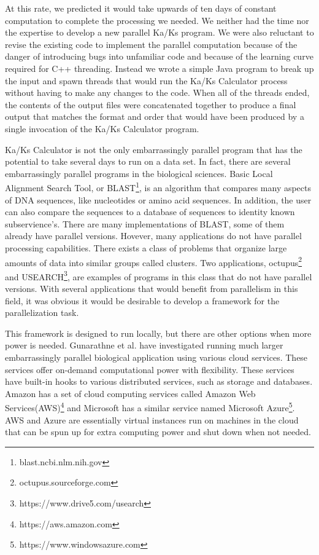 \documentclass[12pt]{article}
\begin{document}
At this rate, we predicted it would take upwards of ten days of constant
computation to complete the processing we needed. We neither had the time nor
the expertise to develop a new parallel Ka/Ks program. We were also reluctant to
revise the existing code to implement the parallel computation because of the
danger of introducing bugs into unfamiliar code and because of the learning
curve required for C++ threading. Instead we wrote a simple Java program to
break up the input and spawn threads that would run the Ka/Ks Calculator process
without having to make any changes to the code. When all of the threads ended,
the contents of the output files were concatenated together to produce a final
output that matches the format and order that would have been produced by a
single invocation of the Ka/Ks Calculator program.

Ka/Ks Calculator is not the only embarrassingly parallel program that has the
potential to take several days to run on a data set. In fact, there are several
embarrassingly parallel programs in the biological sciences. Basic Local
Alignment Search Tool, or BLAST\footnote{blast.ncbi.nlm.nih.gov}, is an
algorithm that compares many aspects of DNA sequences, like nucleotides or amino
acid sequences. In addition, the user can also compare the sequences to a
database of sequences to identity known subservience's. There are many
implementations of BLAST, some of them already have parallel versions.  Hovever,
many applications do not have parallel processing capabilities. There exists a
class of problems that organize large amounts of data into similar groups called
clusters. Two applications, octupus\footnote{octupus.sourceforge.com} and
USEARCH\footnote{https://www.drive5.com/usearch}, are examples of programs in
this class that do not have parallel versions. With several applications that
would benefit from parallelism in this field, it was obvious it would be
desirable to develop a framework for the parallelization task.

This framework is designed to run locally, but there are other options when more
power is needed. Gunarathne et al.\cite{cloud} have investigated running much
larger embarrassingly parallel biological application using various cloud
services. These services offer on-demand computational power with flexibility.
These services have built-in hooks to various distributed services, such as
storage and databases. Amazon has a set of cloud computing services called
Amazon Web Services(AWS)\footnote{https://aws.amazon.com} and Microsoft has a
similar service named Microsoft Azure\footnote{https://www.windowsazure.com}.
AWS and Azure are essentially virtual instances run on machines in the cloud
that can be spun up for extra computing power and shut down when not needed. 
\end{document}
